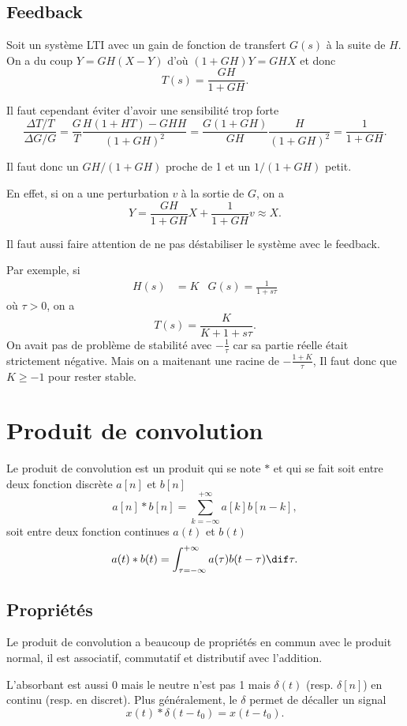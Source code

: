 \subsection{Feedback}
Soit un système LTI avec un gain de fonction de transfert $G(s)$ à la suite
de $H$.
On a du coup $Y = GH(X - Y)$ d'où $(1+GH)Y = GHX$ et donc
\[ T(s) = \frac{GH}{1+GH}. \]

Il faut cependant éviter d'avoir une sensibilité trop forte
\[ \frac{\Delta T/T}{\Delta G/G} =
\frac{G}{T}\frac{H(1 + HT) - GHH}{(1+GH)^2}
= \frac{G(1+GH)}{GH}\frac{H}{(1+GH)^2}
= \frac{1}{1+GH}. \]

Il faut donc un $GH/(1+GH)$ proche de 1 et un $1/(1+GH)$ petit.

En effet, si on a une perturbation $v$ à la sortie de $G$, on a
\[ Y = \frac{GH}{1+GH}X + \frac{1}{1+GH}v \approx X. \]

Il faut aussi faire attention de ne pas déstabiliser le système avec
le feedback.

Par exemple, si
\begin{align*}
  H(s) & = K & G(s) = \frac{1}{1+s\tau}
\end{align*}
où $\tau > 0$, on a
\[ T(s) = \frac{K}{K + 1 + s\tau}. \]
On avait pas de problème de stabilité avec $-\frac{1}{\tau}$ car sa partie
réelle était strictement négative.
Mais on a maitenant une racine de $-\frac{1+K}{\tau}$,
Il faut donc que $K \geq -1$ pour rester stable.


\annexe
\section{Produit de convolution}
Le produit de convolution est un produit qui se note $*$ et qui se fait
soit entre deux fonction discrète $a[n]$ et $b[n]$
\[ a[n] * b[n] = \sum_{k=-\infty}^{+\infty} a[k]b[n-k], \]
soit entre deux fonction continues $a(t)$ et $b(t)$
\[ a(t) * b(t) = \int_{\tau=-\infty}^{+\infty} a(\tau)b(t-\tau) \dif \tau. \]

\subsection{Propriétés}
Le produit de convolution a beaucoup de propriétés en commun avec le produit
normal, il est associatif, commutatif et distributif avec l'addition.

L'absorbant est aussi 0 mais le neutre n'est pas 1 mais
$\delta(t)$ (resp. $\delta[n]$) en continu (resp. en discret).
Plus généralement, le $\delta$ permet de décaller un signal
\[ x(t) * \delta(t - t_0) = x(t - t_0). \]

